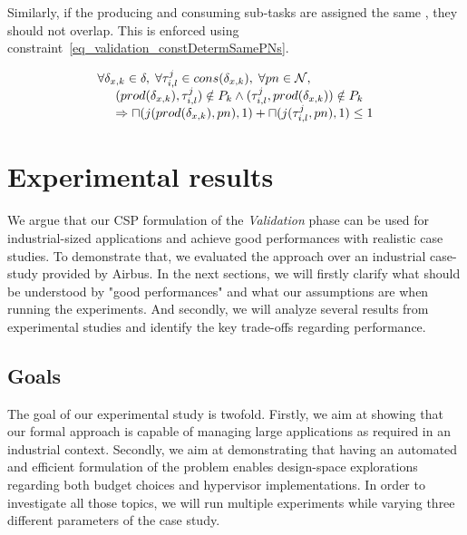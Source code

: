 \documentclass[main.tex]{subfiles}
\begin{document}
Similarly, if the producing and consuming sub-tasks are assigned the same
\PN{}, they should not overlap. This is enforced using
constraint~\ref{eq_validation_constDetermSamePNs}.

\begin{equation}
    \label{eq_validation_constDetermSamePNs}
    \begin{array}{l}
        \forall \delta_{x,k} \in \delta , \; \forall \tau_{i,l}^j \in cons( \delta_{x,k} ), \; \forall pn \in \mathcal{N}, \\
        \hspace{5mm} ( prod(\delta_{x,k}), \tau_{i,l}^j ) \notin P_k \land (\tau_{i,l}^j, prod(\delta_{x,k})) \notin P_k \\
        \hspace{5mm} \Rightarrow \sqcap ( j(prod(\delta_{x,k}), pn) ,1) + \sqcap ( j(\tau_{i,l}^j, pn) ,1) \leq 1
    \end{array}
\end{equation}


\section{Experimental results}
\label{sec_budgetValidation_experimentalRes}

We argue that our CSP formulation of the \emph{Validation} phase can be used
for industrial-sized applications and achieve good performances with realistic
case studies. To demonstrate that, we evaluated the approach over an industrial
case-study provided by Airbus. In the next sections, we will firstly clarify
what should be understood by "good performances" and what our assumptions are
when running the experiments. And secondly, we will analyze several results
from experimental studies and identify the key trade-offs regarding
performance.

\subsection{Goals}
\label{ssec_validation_goalsExpe}
The goal of our experimental study is twofold. Firstly, we aim at showing that
our formal approach is capable of managing large applications as required in an
industrial context. Secondly, we aim at demonstrating that having an automated
and efficient formulation of the problem enables design-space explorations
regarding both budget choices and hypervisor implementations. In order to
investigate all those topics, we will run multiple experiments while varying
three different parameters of the case study.
\end{document}
